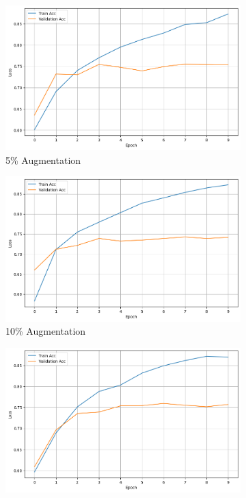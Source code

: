 \documentclass{article}
\begin{document}
\begin{figure}[ht]
  \centering
  \begin{subfigure}[b]{0.3\textwidth}
    \includegraphics[width=\textwidth]{img/synonym_5.png}
    \caption{5\% Augmentation}
    \label{fig:synonym_5}
  \end{subfigure}
  \hfill
  \begin{subfigure}[b]{0.3\textwidth}
    \includegraphics[width=\textwidth]{img/synonym_10.png}
    \caption{10\% Augmentation}
    \label{fig:synonym_10}
  \end{subfigure}
  \hfill
  \begin{subfigure}[b]{0.3\textwidth}
    \includegraphics[width=\textwidth]{img/synonym_20.png}

\end{subfigure}
\end{figure}
\end{document}
